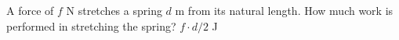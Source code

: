 {A force of $f$ N stretches a spring $d$ m from its natural length. How much work is performed in stretching the spring?}
{$f\cdot d/2$ J}
